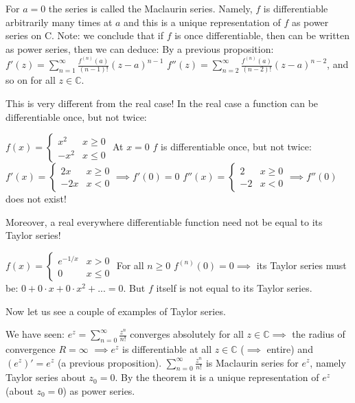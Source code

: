 \documentclass[12pt]{article}
\begin{document}
\begin{remark}
For $a=0$ the series is called the Maclaurin series.
Namely, $f$ is differentiable arbitrarily many times at $a$ and this is a unique representation of $f$ as power series on C.
Note: we conclude that if $f$ is once differentiable, then can be written as power series, then we can deduce:
By a previous proposition: $f'(z) = \sum_{n=1}^\infty \frac{f^{(n)}(a)}{(n-1)!}(z-a)^{n-1}$
$f''(z) = \sum_{n=2}^\infty \frac{f^{(n)}(a)}{(n-2)!}(z-a)^{n-2}$, and so on for all $z \in \mathbb{C}$.
\end{remark}

\begin{remark}
This is very different from the real case!
In the real case a function can be differentiable once, but not twice:
\end{remark}

\begin{example}
$f(x) = \begin{cases} x^2 & x \geq 0 \\ -x^2 & x \leq 0 \end{cases}$
At $x=0$ $f$ is differentiable once, but not twice: $f'(x) = \begin{cases} 2x & x \geq 0 \\ -2x & x < 0 \end{cases} \implies f'(0) = 0$
$f''(x) = \begin{cases} 2 & x \geq 0 \\ -2 & x < 0 \end{cases} \implies f''(0)$ does not exist!
\end{example}
Moreover, a real everywhere differentiable function need not be equal to its Taylor series!

\begin{example}
$f(x) = \begin{cases} e^{-1/x} & x > 0 \\ 0 & x \leq 0 \end{cases}$
For all $n \geq 0$ $f^{(n)}(0) = 0 \implies$ its Taylor series must be:
$0 + 0\cdot x + 0 \cdot x^2 + ... = 0$. But $f$ itself is not equal to its Taylor series.
\end{example}

Now let us see a couple of examples of Taylor series.

\begin{example}
We have seen: $e^z = \sum_{n=0}^\infty \frac{z^n}{n!}$ converges absolutely for all $z \in \mathbb{C} \implies$ the radius of convergence $R = \infty$ $\implies e^z$ is differentiable at all $z \in \mathbb{C}$ ($\implies$ entire) and $(e^z)' = e^z$ (a previous proposition).
$\sum_{n=0}^\infty \frac{z^n}{n!}$ is Maclaurin series for $e^z$, namely Taylor series about $z_0 = 0$. By the theorem it is a unique representation of $e^z$ (about $z_0 = 0$) as power series.
\end{example}
\end{document}
